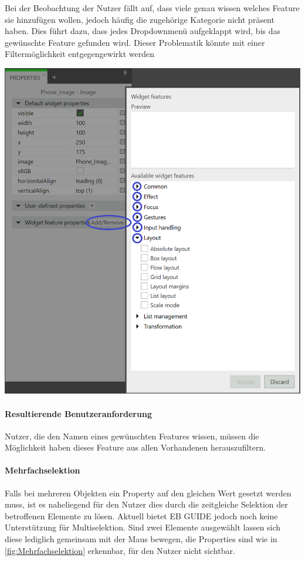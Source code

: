 Bei der Beobachtung der Nutzer fällt auf, dass viele genau wissen welches Feature sie hinzufügen wollen, jedoch häufig die zugehörige Kategorie nicht präsent haben.
Dies führt dazu, dass jedes Dropdownmenü aufgeklappt wird, bis das gewünschte Feature gefunden wird.
Dieser Problematik könnte mit einer Filtermöglichkeit entgegengewirkt werden

\begin{center}
  \includegraphics[scale=0.5]{figures/WidgetFeatureProperty.png}
  \label{fig:WidgetFeatureProperty}
\end{center}

\paragraph{Resultierende Benutzeranforderung}
Nutzer, die den Namen eines gewünschten Features wissen, müssen die Möglichkeit haben dieses Feature aus allen Vorhandenen herauszufiltern.

\paragraph{Mehrfachselektion}
Falls bei mehreren Objekten ein Property auf den gleichen Wert gesetzt werden muss, ist es naheliegend für den Nutzer dies durch die zeitgleiche Selektion der betroffenen Elemente zu lösen.
Aktuell bietet EB GUIDE jedoch noch keine Unterstützung für Multiselektion.
Sind zwei Elemente ausgewählt lassen sich diese lediglich gemeinsam mit der Maus bewegen, die Properties sind wie in \cref{fig:Mehrfachselektion} erkennbar, für den Nutzer nicht sichtbar.

